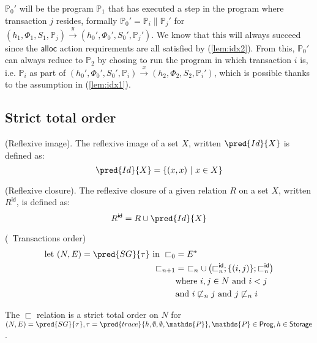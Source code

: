 $\mathds{P}_0'$ will be the program $\mathds{P}_1$ that has executed a step in the program where transaction $j$ resides, formally $\mathds{P}_0' = \mathds{P}_i \| \mathds{P}_j'$ for $(h_1, \Phi_1, S_1, \mathds{P}_j) \xrightarrow{y} (h_0', \Phi_0', S_0', \mathds{P}_j')$. We know that this will always succeed since the $\mathsf{alloc}$ action requirements are all satisfied by (\ref{lem:idx2}). From this, $\mathds{P}_0'$ can always reduce to $\mathds{P}_2$ by chosing to run the program in which transaction $i$ is, i.e. $\mathds{P}_i$ as part of $(h_0', \Phi_0', S_0', \mathds{P}_i) \xrightarrow{x} (h_2, \Phi_2, S_2, \mathds{P}_i')$, which is possible thanks to the assumption in (\ref{lem:idx1}).

\subsection{Strict total order}

 (Reflexive image). The reflexive image of a set $X$, written $\pred{Id}{X}$ is defined as:
\[
	\pred{Id}{X} = \{ (x, x)\ |\ x \in X \}
\]

 (Reflexive closure). The reflexive closure of a given relation $R$ on a set $X$, written $R^\mathsf{id}$, is defined as:
\[
	R^\mathsf{id} = R \cup \pred{Id}{X}
\]

 (\tpl\ Transactions order)
\begin{align*}
	\text{let } (N, E) = \pred{SG}{\tau} \text{ in }
	\sqsubset_0 &= E^* \\
	\sqsubset_{n + 1} &=\ \sqsubset_n \cup \left( \sqsubset_n^\mathsf{id} ; \{ (i, j) \} ; \sqsubset_n^\mathsf{id} \right) \\
	&\text{where } i, j \in N \text{ and } i < j \\
	&\text{and } i \not\sqsubset_n j \text{ and } j \not\sqsubset_n i
\end{align*}

\thm \label{thm:totOrder} The $\sqsubset$ relation is a strict total order on $N$ for $(N, E) = \pred{SG}{\tau}, \tau = \pred{trace}{h, \emptyset, \emptyset, \mathds{P}}, \mathds{P} \in \mathsf{Prog}, h \in \mathsf{Storage}$.

